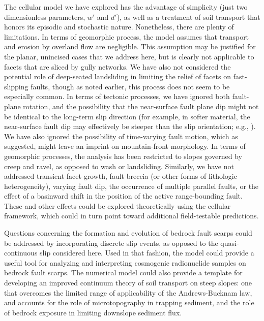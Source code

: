 The cellular model we have explored has the advantage of simplicity (just two dimensionless parameters, $w'$ and $d'$), as well as a treatment of soil transport that honors its episodic and stochastic nature. Nonetheless, there are plenty of limitations. In terms of geomorphic process, the model assumes that transport and erosion by overland flow are negligible. This assumption may be justified for the planar, unincised cases that we address here, but is clearly not applicable to facets that are sliced by gully networks. We have also not considered the potential role of deep-seated landsliding in limiting the relief of facets on fast-slipping faults, though as noted earlier, this process does not seem to be especially common. In terms of tectonic processes, we have ignored both fault-plane rotation, and the possibility that the near-surface fault plane dip might not be identical to the long-term slip direction (for example, in softer material, the near-surface fault dip may effectively be steeper than the slip orientation; e.g., \citet{mccalpin2009paleoseismology}). We have also ignored the possibility of time-varying fault motion, which as \citet{hamblin1976patterns} suggested, might leave an imprint on mountain-front morphology. In terms of geomorphic processes, the analysis has been restricted to slopes governed by creep and ravel, as opposed to wash or landsliding. Similarly, we have not addressed transient facet growth, fault breccia (or other forms of lithologic heterogeneity), varying fault dip, the occurrence of multiple parallel faults, or the effect of a basinward shift in the position of the active range-bounding fault. These and other effects could be explored theoretically using the cellular framework, which could in turn point toward additional field-testable predictions.

Questions concerning the formation and evolution of bedrock fault scarps could be addressed by incorporating discrete slip events, as opposed to the quasi-continuous slip considered here. Used in that fashion, the model could provide a useful tool for analyzing and interpreting cosmogenic radionuclide samples on bedrock fault scarps. The numerical model could also provide a template for developing an improved continuum theory of soil transport on steep slopes: one that overcomes the limited range of applicability of the Andrews-Bucknam law, and accounts for the role of microtopography in trapping sediment, and the role of bedrock exposure in limiting downslope sediment flux.




